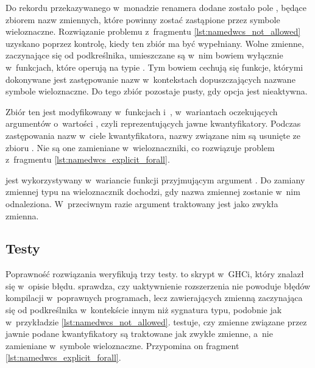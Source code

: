 Do rekordu  przekazywanego w~monadzie renamera  dodane zostało
pole , będące zbiorem nazw zmiennych, które powinny
zostać zastąpione przez symbole wieloznaczne. Rozwiązanie problemu z~fragmentu
\ref{lst:namedwcs_not_allowed} uzyskano poprzez kontrolę, kiedy ten zbiór ma być
wypełniany. Wolne zmienne, zaczynające się od podkreślnika, umieszczane są w~nim
bowiem wyłącznie w~funkcjach, które operują na typie
. Tym bowiem cechują się funkcje, którymi dokonywane jest
zastępowanie nazw w~kontekstach dopuszczających nazwane symbole wieloznaczne. Do
tego zbiór pozostaje pusty, gdy opcja  jest nieaktywna.

Zbiór ten jest modyfikowany w~funkcjach  i~,
w~wariantach oczekujących argumentów o~wartości , czyli
reprezentujących jawne kwantyfikatory. Podczas zastępowania nazw w~ciele
kwantyfikatora, nazwy związane nim są usunięte ze zbioru .
Nie są one zamieniane w~wieloznaczniki, co rozwiązuje problem
z~fragmentu \ref{lst:namedwcs_explicit_forall}.

 jest wykorzystywany w~wariancie funkcji
 przyjmującym argument . Do zamiany zmiennej typu
na wieloznacznik dochodzi, gdy nazwa zmiennej zostanie w~nim odnaleziona.
W~przeciwnym razie argument traktowany jest jako zwykła zmienna.

\subsection{Testy} %

Poprawność rozwiązania weryfikują trzy testy.  to skrypt w~GHCi,
który znalazł się w~opisie błędu.  sprawdza, czy
uaktywnienie rozszerzenia  nie powoduje błędów kompilacji
w~poprawnych programach, lecz zawierających zmienną zaczynająca się od
podkreślnika w~kontekście innym niż sygnatura typu, podobnie jak w~przykładzie
\ref{lst:namedwcs_not_allowed}.  testuje, czy
zmienne związane przez jawnie podane kwantyfikatory są traktowane jak zwykłe
zmienne, a~nie zamieniane w~symbole wieloznaczne. Przypomina on fragment
\ref{lst:namedwcs_explicit_forall}.
